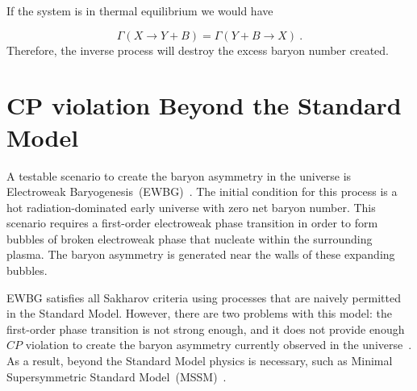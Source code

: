 If the system is in thermal equilibrium we would have

\begin{equation}
\Gamma(X \rightarrow Y + B) = \Gamma(Y + B \rightarrow X)~.
\end{equation}
Therefore, the inverse process will destroy the excess baryon number
created.



\section{CP violation Beyond the Standard Model}
A testable scenario to create the baryon asymmetry in the universe is
Electroweak Baryogenesis~(EWBG)~\cite{Morrissey2012}. The initial
condition for this process is a hot radiation-dominated early universe
with zero net baryon number. This scenario requires a first-order
electroweak phase transition in order to form bubbles of broken
electroweak phase that nucleate within the surrounding plasma. The
baryon asymmetry is generated near the walls of these expanding
bubbles.

EWBG satisfies all Sakharov criteria using processes that are naively
permitted in the Standard Model. However, there are two problems with
this model: the first-order phase transition is not strong enough, and
it does not provide enough $CP$ violation to create the baryon
asymmetry currently observed in the universe~\cite{Cline2017}. As a
result, beyond the Standard Model physics is necessary, such as
Minimal Supersymmetric Standard Model~(MSSM)~\cite{Carena1996}.

